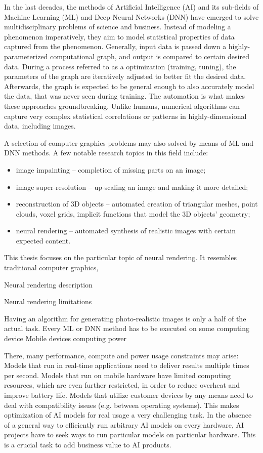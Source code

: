 In the last decades, the methods of Artificial Intelligence (AI) and its sub-fields of Machine Learning (ML) and Deep Neural Networks (DNN) have emerged to solve multidisciplinary problems of science and business. Instead of modeling a phenomenon imperatively, they aim to model statistical properties of data captured from the phenomenon. Generally, input data is passed down a highly-parameterized computational graph, and output is compared to certain desired data. During a process referred to as a optimization (training, tuning), the parameters of the graph are iteratively adjusted to better fit the desired data. Afterwards, the graph is expected to be general enough to also accurately model the data, that was never seen during training. The automation is what makes these approaches groundbreaking. Unlike humans, numerical algorithms can capture very complex statistical correlations or patterns in highly-dimensional data, including images.

A selection of computer graphics problems may also solved by means of ML and DNN methods. A few notable research topics in this field include:
\begin{itemize}
\item image impainting -- completion of missing parts on an image;
\item image super-resolution -- up-scaling an image and making it more detailed;
\item reconstruction of 3D objects -- automated creation of triangular meshes, point clouds, voxel grids, implicit functions that model the 3D objects' geometry;
\item neural rendering -- automated synthesis of realistic images with certain expected content.
\end{itemize}

This thesis focuses on the particular topic of neural rendering. It resembles traditional computer graphics,
 
 Neural rendering description
 
 Neural rendering limitations
 
 Having an algorithm for generating photo-realistic images is only a half of the actual task. Every ML or DNN method has to be executed on some computing device
 Mobile devices computing power
 
 There, many performance, compute and power usage constraints may arise:
 Models that run in real-time applications need to deliver results multiple times per
 second.
 Models that run on mobile hardware have limited computing resources, which are
 even further restricted, in order to reduce overheat and improve battery life.
 Models that utilize customer devices by any means need to deal with compatibility
 issues (e.g. between operating systems).
 This makes optimization of AI models for real usage a very challenging task. In the
 absence of a general way to efficiently run arbitrary AI models on every hardware, AI
 projects have to seek ways to run particular models on particular hardware. This is a
 crucial task to add business value to AI products.

